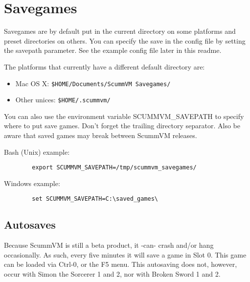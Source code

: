 \section {Savegames}
Savegames are by default put in the current directory on some platforms and
preset directories on others.  You can specify the save in the config file by
setting the savepath parameter. See the example config file later in this
readme.

The platforms that currently have a different default directory are:
%
\begin{itemize}
\item Mac OS X: \verb#$HOME/Documents/ScummVM Savegames/#
\item Other unices: \verb#$HOME/.scummvm/#
\end{itemize}
%
You can also use the environment variable SCUMMVM\_SAVEPATH to specify where to
put save games. Don't forget the trailing directory separator. Also be aware
that saved games may break between ScummVM releases.

Bash (Unix) example:
\begin{verbatim}
        export SCUMMVM_SAVEPATH=/tmp/scummvm_savegames/
\end{verbatim}
Windows example:
\begin{verbatim}
        set SCUMMVM_SAVEPATH=C:\saved_games\
\end{verbatim}


\subsection {Autosaves}
Because ScummVM is still a beta product, it -can- crash and/or hang
occasionally. As such, every five minutes it will save a game in Slot 0. This
game can be loaded via Ctrl-0, or the F5 menu. This autosaving does not, 
however, occur with Simon the Sorcerer 1 and 2, nor with Broken Sword 1 and 2.


